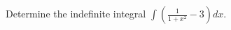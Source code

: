 \documentclass{ximera}
\author{Gregory Hartman \and Matthew Carr}
\begin{document}
\begin{exercise}

Determine the indefinite integral $\int\left(\frac{1}{1+x^2}-3\right)dx$.

\begin{prompt}
\begin{multipleChoice}
\end{multipleChoice}
\end{prompt}
\end{exercise}
\end{document}
